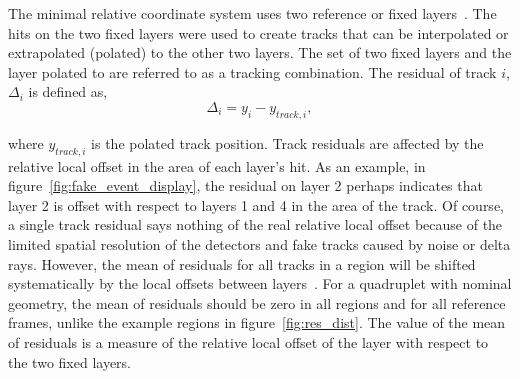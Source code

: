 
The minimal relative coordinate system uses two reference or fixed layers~\cite{lefebvre_thesis}. The hits on the two fixed layers were used to create tracks that can be interpolated or extrapolated (polated) to the other two layers. The set of two fixed layers and the layer polated to are referred to as a tracking combination. The residual of track $i$, $\Delta_i$ is defined as,
\begin{equation}
    \Delta_i = y_{i} - y_{track, i},
    \label{eqn:residual}
\end{equation}

where $y_{track, i}$ is the polated track position. Track residuals are affected by the relative local offset in the area of each layer's hit. As an example, in figure~\ref{fig:fake_event_display}, the residual on layer 2 perhaps indicates that layer 2 is offset with respect to layers 1 and 4 in the area of the track. Of course, a single track residual says nothing of the real relative local offset because of the limited spatial resolution of the detectors and fake tracks caused by noise or delta rays. However, the mean of residuals for all tracks in a region will be shifted systematically by the local offsets between layers~\cite{lefebvre_thesis}. For a quadruplet with nominal geometry, the mean of residuals should be zero in all regions and for all reference frames, unlike the example regions in figure~\ref{fig:res_dist}. The value of the mean of residuals is a measure of the relative local offset of the layer with respect to the two fixed layers.


